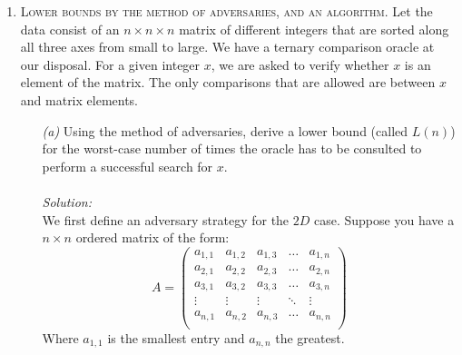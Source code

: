 \documentclass[12pt]{article}
\theoremstyle{definition}
\theoremstyle{remark}
\newcommand\sol{%
  \\ 
  \\
  \textit{Solution:}\\%
}
\begin{document}
\begin{enumerate}
  \newpage
  \item \textsc{Lower bounds by the method of adversaries, and an algorithm.} Let the data
consist of an $n \times n\times n$ matrix of different integers that are sorted along all three axes from small to large. We have a ternary comparison oracle at our disposal. For a given integer $x$, we are asked to verify whether $x$ is an element of the matrix. The only comparisons that are allowed are between $x$ and matrix elements. 
\begin{enumerate}
  \item[\it (a)] Using the method of adversaries, derive a lower bound (called $L(n)$) for the worst-case number of times the oracle has to be consulted to perform a successful search for $x$. 
  \sol 
  We first define an adversary strategy for the $2D$ case. Suppose you have a $n\times n$ ordered matrix of the form: 
  $$A = \begin{pmatrix}
    a_{1,1} & a_{1,2} & a_{1,3} & \hdots & a_{1,n} \\ 

    a_{2,1} & a_{2,2} & a_{2,3} & \hdots & a_{2,n} \\ 

    a_{3,1} & a_{3,2} & a_{3,3} & \hdots & a_{3,n} \\ 
    \vdots & \vdots & \vdots & \ddots & \vdots \\ 
    
    a_{n,1} & a_{n,2} & a_{n,3} & \hdots & a_{n,n} \\ 
  \end{pmatrix}$$
  Where $a_{1,1}$ is the smallest entry and $a_{n,n}$ the greatest. 


\end{enumerate}
\end{enumerate}
\end{document}
